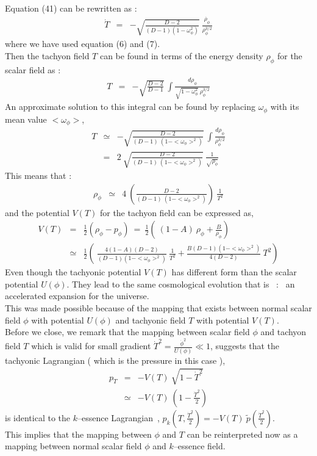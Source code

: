 \documentclass[a4paper,12pt,a4]{article}
\begin{document}
Equation (41) can be rewritten as : 
\begin{eqnarray}
\dot{T} & = & - \sqrt{\frac{D-2}{( D-1) (1 - \omega_{\phi}^2 )}}~ 
\frac{\dot{\rho_{\phi}}}{\rho_{\phi}^{3/2}}  
\end{eqnarray} 
where we have used equation (6) and (7). \\ 
Then the tachyon field $T$ can be found in terms of the energy density 
$\rho_{\phi}$ for the scalar field as : 
\begin{eqnarray}
T & = & - \sqrt{\frac{D-2}{D-1}}~ \int 
\frac{d \rho_{\phi}}{\sqrt{1 - \omega_{\phi}^2 }~ \rho_{\phi}^{3/2}}  
\end{eqnarray} 
An approximate solution to this integral can be found by replacing 
$\omega_{\phi}$ with its mean value $< \omega_{\phi} >$, 
\begin{eqnarray}
T & \simeq & - \sqrt{\frac{D-2}{(D-1)~(1 - < \omega_{\phi} >^2 )}}~ \int 
\frac{d \rho_{\phi}}{\rho_{\phi}^{3/2}}  \nonumber \\
& = & 2~ \sqrt{\frac{D-2}{(D-1)~(1 - < \omega_{\phi} >^2 )}}~ 
\frac{1}{\sqrt{\rho_{\phi}}} 
\end{eqnarray}
This means that : 
\begin{eqnarray}
\rho_{\phi} & \simeq & 4~ 
\left( \frac{D-2}{(D-1)~(1 - < \omega_{\phi} >^2 )} \right)~ \frac{1}{T^2} 
\end{eqnarray} 
and the potential $V(T)$ for the tachyon field can be expressed as, 
\begin{eqnarray}
V(T) & = & \frac{1}{2} \left( \rho_{\phi} - p_{\phi} \right)~ = ~ 
\frac{1}{2} \left(~ ( 1 - A )~ \rho_{\phi} 
+ \frac{B}{\rho_{\phi}} \right)  \nonumber \\
& \simeq & \frac{1}{2} 
\left(~ \frac{ 4 (1 - A) (D -2)}{(D-1) (1 - < \omega_{\phi} >^2 )}~
\frac{1}{T^2} +   
\frac{B (D - 1) (1 - < \omega_{\phi} >^2 )}{4 (D-2) }~ T^2 \right) 
\end{eqnarray}  
Even though the tachyonic potential $V(T)$ has different form than 
the scalar potential $U( \phi )$. They lead to the same cosmological 
evolution that is~ :~ an accelerated expansion for the universe. \\
This was made possible because of the mapping that exists between normal 
scalar field $\phi$ with potential $U( \phi)$ and tachyonic field $T$ 
with potential $V(T)$.  \\

Before we close, we remark that the mapping between scalar field $\phi$ and 
tachyon field $T$ which is valid for small gradient 
$\dot{T}^2 = \frac{\dot{\phi}^2}{U (\phi)} \ll 1$, suggests that the 
tachyonic Lagrangian ( which is the pressure in this case ), 
\begin{eqnarray}
p_T & = & - V(T)~ \sqrt{1 - \dot{T}^2 } \nonumber \\
& \simeq & - V(T)~ ( 1 - \frac{\dot{T}^2}{2} ) 
\end{eqnarray}
is identical to the $k$--essence Lagrangian~\cite{stein}, 
$p_k (T, \frac{\dot{T}^2}{2} ) = - V(T)~ \tilde{p} ( \frac{\dot{T}^2}{2})$. \\ 
This implies that the mapping between $\phi$ and $T$ can be reinterpreted now 
as a mapping between normal scalar field $\phi$ and $k$--essence field. 
\end{document}

